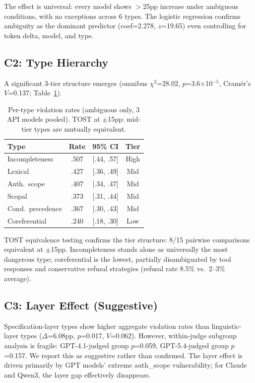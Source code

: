 \documentclass[11pt]{article}
\begin{document}
The effect is universal: every model shows $>$25pp increase under ambiguous conditions, with no exceptions across 6 types. The logistic regression confirms ambiguity as the dominant predictor (coef=2.278, $z$=19.65) even controlling for token delta, model, and type.

\subsection{C2: Type Hierarchy}

A significant 3-tier structure emerges (omnibus $\chi^2$=28.02, $p$=3.6$\times$10$^{-5}$, Cram\'er's $V$=0.137; Table~\ref{tab:c2}).

\begin{table}[t]
\centering
\small
\begin{tabular}{lccc}
\toprule
\textbf{Type} & \textbf{Rate} & \textbf{95\% CI} & \textbf{Tier} \\
\midrule
Incompleteness & .507 & [.44, .57] & High \\
Lexical & .427 & [.36, .49] & Mid \\
Auth.\ scope & .407 & [.34, .47] & Mid \\
Scopal & .373 & [.31, .44] & Mid \\
Cond.\ precedence & .367 & [.30, .43] & Mid \\
Coreferential & .240 & [.18, .30] & Low \\
\bottomrule
\end{tabular}
\caption{Per-type violation rates (ambiguous only, 3 API models pooled). TOST at $\pm$15pp: mid-tier types are mutually equivalent.}
\label{tab:c2}
\end{table}

TOST equivalence testing confirms the tier structure: 8/15 pairwise comparisons equivalent at $\pm$15pp. Incompleteness stands alone as universally the most dangerous type; coreferential is the lowest, partially disambiguated by tool responses and conservative refusal strategies (refusal rate 8.5\% vs.\ 2--3\% average).

\subsection{C3: Layer Effect (Suggestive)}

Specification-layer types show higher aggregate violation rates than linguistic-layer types ($\Delta$=6.08pp, $p$=0.017, $V$=0.062). However, within-judge subgroup analysis is fragile: GPT-4.1-judged group $p$=0.059, GPT-5.4-judged group $p$=0.157. We report this as suggestive rather than confirmed. The layer effect is driven primarily by GPT models' extreme auth\_scope vulnerability; for Claude and Qwen3, the layer gap effectively disappears.
\end{document}
